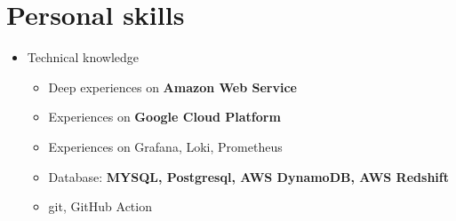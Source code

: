 \documentclass[a4paper,12pt]{article}
\begin{document}
  \section*{Personal skills}
  \begin{itemize}
    \item Technical knowledge
    \begin{itemize}
      \item Deep experiences on \textbf{Amazon Web Service}
      \item Experiences on \textbf{Google Cloud Platform}
      \item Experiences on Grafana, Loki, Prometheus
      \item Database: \textbf{MYSQL, Postgresql, AWS DynamoDB, AWS Redshift}
      \item git, GitHub Action
    \end{itemize}


\end{itemize}
\end{document}
